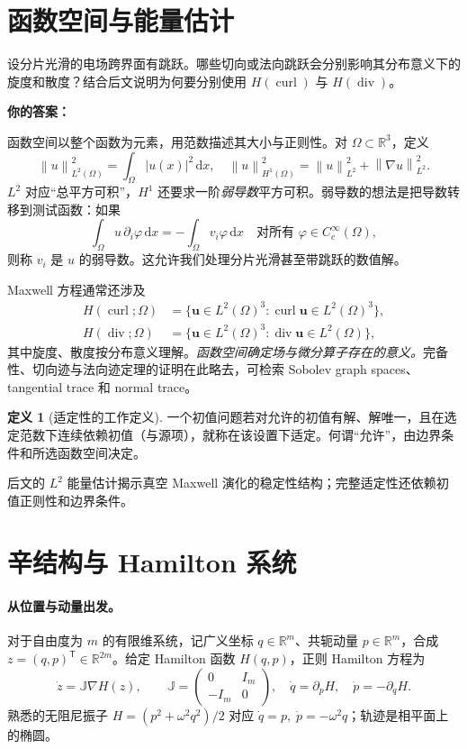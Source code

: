 \documentclass[UTF8,11pt,openany]{ctexbook}
\numberwithin{equation}{chapter}
\theoremstyle{definition}
\newtheorem{definition}[theorem]{定义}
\theoremstyle{remark}
\newcommand{\dd}{\mathrm d}
\newcommand{\RR}{\mathbb R}
\newcommand{\Div}{\operatorname{div}}
\newcommand{\curl}{\operatorname{curl}}
\newcommand{\norm}[1]{\left\lVert #1\right\rVert}
\begin{document}
\section{函数空间与能量估计}
\begin{studentinput}
设分片光滑的电场跨界面有跳跃。哪些切向或法向跳跃会分别影响其分布意义下的旋度和散度？结合后文说明为何要分别使用 $H(\curl)$ 与 $H(\Div)$。

\textbf{你的答案：}\vspace{2cm}
\end{studentinput}
函数空间以整个函数为元素，用范数描述其大小与正则性。对 $\Omega\subset\RR^3$，定义
\begin{equation}
\norm{u}_{L^2(\Omega)}^2=\int_\Omega |u(x)|^2\,\dd x,
\quad
\norm{u}_{H^1(\Omega)}^2=\norm{u}_{L^2}^2+\norm{\nabla u}_{L^2}^2.
\end{equation}
$L^2$ 对应“总平方可积”，$H^1$ 还要求一阶\emph{弱导数}平方可积。弱导数的想法是把导数转移到测试函数：如果
\begin{equation}
\int_\Omega u\,\partial_i\varphi\,\dd x=-\int_\Omega v_i\varphi\,\dd x
\quad\text{对所有 }\varphi\in C_c^\infty(\Omega),
\end{equation}
则称 $v_i$ 是 $u$ 的弱导数。这允许我们处理分片光滑甚至带跳跃的数值解。

Maxwell 方程通常还涉及
\begin{align}
H(\curl;\Omega)&=\{\bm u\in L^2(\Omega)^3:\curl\bm u\in L^2(\Omega)^3\},\\
H(\Div;\Omega)&=\{\bm u\in L^2(\Omega)^3:\Div\bm u\in L^2(\Omega)\},
\end{align}
其中旋度、散度按分布意义理解。\emph{函数空间确定场与微分算子存在的意义。}完备性、切向迹与法向迹定理的证明在此略去，可检索 Sobolev graph spaces、tangential trace 和 normal trace。

\begin{definition}[适定性的工作定义]
一个初值问题若对允许的初值有解、解唯一，且在选定范数下连续依赖初值（与源项），就称在该设置下适定。何谓“允许”，由边界条件和所选函数空间决定。
\end{definition}
后文的 $L^2$ 能量估计揭示真空 Maxwell 演化的稳定性结构；完整适定性还依赖初值正则性和边界条件。


\section{辛结构与 Hamilton 系统}\label{sec:pre-symp}
\paragraph{从位置与动量出发。}
对于自由度为 $m$ 的有限维系统，记广义坐标 $q\in\RR^m$、共轭动量
$p\in\RR^m$，合成 $z=(q,p)^\mathsf T\in\RR^{2m}$。给定 Hamilton 函数
$H(q,p)$，正则 Hamilton 方程为
\begin{equation}\label{eq:canonicalham}
\dot z=\mathbb J\nabla H(z),\qquad
\mathbb J=\begin{pmatrix}0&I_m\\-I_m&0\end{pmatrix},
\quad
\dot q=\partial_pH,\quad \dot p=-\partial_qH.
\end{equation}
熟悉的无阻尼振子 $H=(p^2+\omega^2q^2)/2$ 对应
$\dot q=p,\;\dot p=-\omega^2q$；轨迹是相平面上的椭圆。
\end{document}
